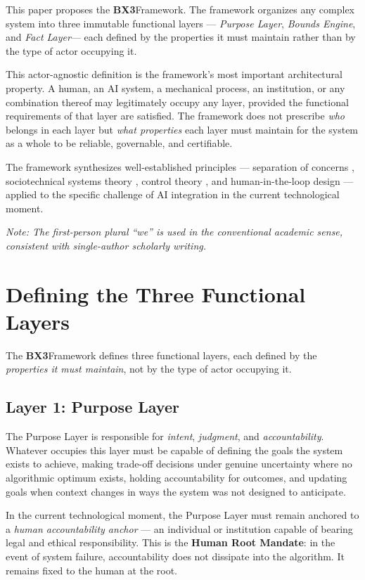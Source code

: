 \documentclass[12pt]{article}
\newcommand{\bxthree}{\textbf{BX3}}
\newcommand{\purpose}{\textit{Purpose Layer}}
\newcommand{\bounds}{\textit{Bounds Engine}}
\newcommand{\fact}{\textit{Fact Layer}}
\begin{document}
This paper proposes the \bxthree Framework. The framework organizes any complex system into three immutable functional layers --- \purpose, \bounds, and \fact --- each defined by the properties it must maintain rather than by the type of actor occupying it.

This actor-agnostic definition is the framework's most important architectural property. A human, an AI system, a mechanical process, an institution, or any combination thereof may legitimately occupy any layer, provided the functional requirements of that layer are satisfied. The framework does not prescribe \textit{who} belongs in each layer but \textit{what properties} each layer must maintain for the system as a whole to be reliable, governable, and certifiable.

The framework synthesizes well-established principles --- separation of concerns \cite{dijkstra1982}, sociotechnical systems theory \cite{trist1981}, control theory \cite{wiener1948}, and human-in-the-loop design \cite{bansal2019} --- applied to the specific challenge of AI integration in the current technological moment.

\medskip
\textit{Note: The first-person plural ``we'' is used in the conventional academic sense, consistent with single-author scholarly writing.}

\section{Defining the Three Functional Layers}
\label{sec:layers}

The \bxthree Framework defines three functional layers, each defined by the \textit{properties it must maintain}, not by the type of actor occupying it.

\subsection{Layer 1: Purpose Layer}
The Purpose Layer is responsible for \textit{intent}, \textit{judgment}, and \textit{accountability}. Whatever occupies this layer must be capable of defining the goals the system exists to achieve, making trade-off decisions under genuine uncertainty where no algorithmic optimum exists, holding accountability for outcomes, and updating goals when context changes in ways the system was not designed to anticipate.

In the current technological moment, the Purpose Layer must remain anchored to a \textit{human accountability anchor} --- an individual or institution capable of bearing legal and ethical responsibility. This is the \textbf{Human Root Mandate}: in the event of system failure, accountability does not dissipate into the algorithm. It remains fixed to the human at the root.
\end{document}
